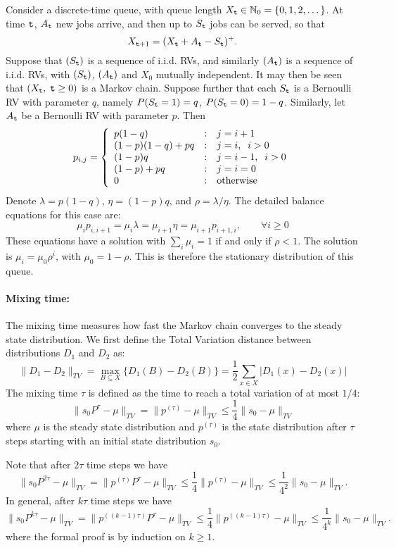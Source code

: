 \begin{example} Consider a discrete-time queue, with queue length $X_{\tt t}\in \mathbb{N}_0=\{0,1,2,\dots\}$. At time  ${\tt t}$, ${A_{\tt t}}$ new jobs arrive, and then up to ${S_{\tt t}}$ jobs can be served, so that
\[{X_{{\tt t} +1}} = {({X_{\tt t}} + {A_{\tt t}} - {S_{\tt t}})^ + }.\]
Suppose that $({S_{\tt t}})$ is a sequence of i.i.d. RVs, and
similarly $({A_{\tt t}})$ is a sequence of i.i.d. RVs, with
$({S_{\tt t}})$, $({A_{\tt t}})$ and ${X_0}$ mutually independent. It
may then be seen that $({X_{\tt t}},\;{\tt t} \ge 0)$ is a Markov chain.
Suppose further that each ${S_{\tt t}}$ is a Bernoulli RV with
parameter $q$, namely $P({S_{\tt t}} = 1) = q$, $P({S_{\tt t}} = 0) =
1 - q$. Similarly, let ${A_{\tt t}}$ be a Bernoulli RV with parameter
$p$. Then
\[{p_{i,j}} = \left\{ {\begin{array}{*{20}{l}}
{p(1 - q)}&:&{j = i + 1}\\
{(1 - p)(1 - q) + pq}&:&{j = i,\;\;i > 0}\\
{(1 - p)q}&:&{j = i - 1,\;\;i > 0}\\
{(1 - p) + pq}&:&{j = i = 0}\\
0&:&{{\rm{otherwise}}}
\end{array}} \right.\]
 Denote $\lambda  = p(1 - q)$, $\eta  = (1 - p)q$, and $\rho  = \lambda /\eta $.   The detailed balance equations for this case are:
\[
\mu_i p_{i,i+1}={\mu _i}\lambda  = {\mu _{i + 1}}\eta=\mu_{i+1}p_{i+1,i} ,\quad \quad \forall i \ge 0\]
These equations have a solution with $\sum_{i}\mu _i = 1$ if and
only if $\rho  < 1$. The solution is ${\mu _i} = {\mu _0}{\rho ^i}$,
with ${\mu _0} = 1 - \rho $. This is therefore the stationary
distribution of this queue.
\end{example}


\paragraph{Mixing time:} %
The mixing time measures how fast the Markov chain converges to the steady state distribution. We first define the Total Variation distance between distributions $D_1$ and $D_2$ as:
\[
\|D_1-D_2\|_{TV}=\max_{B\subseteq X} \{ D_1(B)-D_2(B) \}
=\frac{1}{2}\sum_{x\in X} | D_1 (x) - D_2(x) |
\]
The mixing time $\tau$ is defined as the time to reach a total variation of at most $1/4$:
\[
\|s_0 P^{\tau}-\mu\|_{TV}=\|p^{(\tau)}-\mu\|_{TV}\leq \frac{1}{4}\| s_0-\mu\|_{TV}
\]
where $\mu$ is the steady state distribution and $p^{(\tau)}$ is the state distribution after $\tau$ steps starting with an initial state distribution $s_0$.

Note that after $2\tau$ time steps we have 
\[
\|s_0 P^{2\tau}-\mu\|_{TV}=\|p^{(\tau)}P^{\tau}-\mu\|_{TV}\leq \frac{1}{4}\| p^{(\tau)}-\mu\|_{TV}\leq \frac{1}{4^2}\| s_0-\mu\|_{TV}.
\]
In general, after $k\tau$ time steps we have 
\[
\|s_0 P^{k\tau}-\mu\|_{TV}=\|p^{((k-1)\tau)}P^{\tau}-\mu\|_{TV}\leq \frac{1}{4}\| p^{((k-1)\tau)}-\mu\|_{TV}\leq \frac{1}{4^k}\| s_0-\mu\|_{TV}.
\]
where the formal proof is by induction on $k\geq1$.

